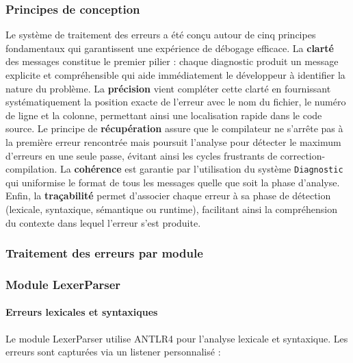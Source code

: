 \subsubsection{Principes de conception}

Le système de traitement des erreurs a été conçu autour de cinq principes fondamentaux qui garantissent une expérience de débogage efficace. La \textbf{clarté} des messages constitue le premier pilier : chaque diagnostic produit un message explicite et compréhensible qui aide immédiatement le développeur à identifier la nature du problème. La \textbf{précision} vient compléter cette clarté en fournissant systématiquement la position exacte de l'erreur avec le nom du fichier, le numéro de ligne et la colonne, permettant ainsi une localisation rapide dans le code source. Le principe de \textbf{récupération} assure que le compilateur ne s'arrête pas à la première erreur rencontrée mais poursuit l'analyse pour détecter le maximum d'erreurs en une seule passe, évitant ainsi les cycles frustrants de correction-compilation. La \textbf{cohérence} est garantie par l'utilisation du système \texttt{Diagnostic} qui uniformise le format de tous les messages quelle que soit la phase d'analyse. Enfin, la \textbf{traçabilité} permet d'associer chaque erreur à sa phase de détection (lexicale, syntaxique, sémantique ou runtime), facilitant ainsi la compréhension du contexte dans lequel l'erreur s'est produite.

\subsubsection{Traitement des erreurs par module}\label{subsec:traitement-des-erreurs-par-module}

\subsubsection{Module LexerParser}

\paragraph{Erreurs lexicales et syntaxiques}

Le module LexerParser utilise ANTLR4 pour l'analyse lexicale et syntaxique.
Les erreurs sont capturées via un listener personnalisé :

